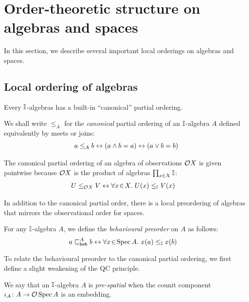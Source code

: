 \section{Order-theoretic structure on algebras and spaces}\label{sec:order-theoretic-structure}

In this section, we describe several important local orderings on algebras and spaces.


\subsection{Local ordering of algebras}

Every $\mathbb{I}$-algebras has a built-in ``canonical'' partial ordering.

\begin{definition}
  We shall write $\le_A$ for the \emph{canonical} partial ordering of an $\mathbb{I}$-algebra $A$ defined equivalently by meets or joins:
  \[ 
    a\le_A b \leftrightarrow (a\wedge b = a) \leftrightarrow (a\vee b = b)
  \]
\end{definition}

\begin{example}
  The canonical partial ordering of an algebra of observations $\mathcal{O}{X}$ is given pointwise because $\mathcal{O}{X}$ is the product of algebras $\prod_{x\in X}\mathbb{I}$:
  \begin{align*}
    U\le_{\mathcal{O}{X}} V 
    &\leftrightarrow \forall x\!\in\!X.\  U(x)\le_{\mathbb{I}} V(x)
  \end{align*}
\end{example}

In addition to the canonical partial order, there is a local preordering of algebras that mirrors the observational order for spaces.

\begin{definition}
  For any $\mathbb{I}$-algebra $A$, we define the \emph{behavioural preorder} on $A$ as follows:
  \begin{align*}
    a \behle[A] b &\eq \fa{x}{\spec{A}} x(a) \le_{\mbb{I}} x(b)
  \end{align*}
\end{definition}


To relate the behavioural preorder to the canonical partial ordering, we first define a slight weakening of the \gls{QC} principle.

\begin{definition}
  We say that an $\mathbb{I}$-algebra $A$ is \emph{pre-spatial} when the counit component $\iota_A\colon A\to \mathcal{O}\operatorname{Spec}{A}$ is an embedding.
\end{definition}

